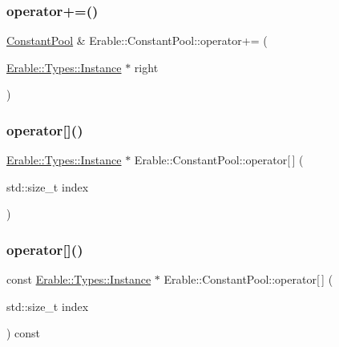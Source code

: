 \mbox{\label{class_erable_1_1_constant_pool_a910c3a76017076dcbb4930b3a9f30440}} 
\subsubsection{\texorpdfstring{operator+=()}{operator+=()}}
{\footnotesize\ttfamily \mbox{\hyperlink{class_erable_1_1_constant_pool}{Constant\+Pool}} \& Erable\+::\+Constant\+Pool\+::operator+= (\begin{DoxyParamCaption}\item[{\mbox{\hyperlink{class_erable_1_1_erable_1_1_types_1_1_instance}{Erable\+::\+Types\+::\+Instance}} $\ast$}]{right }\end{DoxyParamCaption})}

\mbox{\label{class_erable_1_1_constant_pool_a27b506e641c44a1775370d9c857f965d}} 
\subsubsection{\texorpdfstring{operator[]()}{operator[]()}\hspace{0.1cm}{\footnotesize\ttfamily [1/2]}}
{\footnotesize\ttfamily \mbox{\hyperlink{class_erable_1_1_erable_1_1_types_1_1_instance}{Erable\+::\+Types\+::\+Instance}} $\ast$ Erable\+::\+Constant\+Pool\+::operator\mbox{[}$\,$\mbox{]} (\begin{DoxyParamCaption}\item[{std\+::size\+\_\+t}]{index }\end{DoxyParamCaption})}

\mbox{\label{class_erable_1_1_constant_pool_af260e8d99d978ceeed2bfb15533e2e87}} 
\subsubsection{\texorpdfstring{operator[]()}{operator[]()}\hspace{0.1cm}{\footnotesize\ttfamily [2/2]}}
{\footnotesize\ttfamily const \mbox{\hyperlink{class_erable_1_1_erable_1_1_types_1_1_instance}{Erable\+::\+Types\+::\+Instance}} $\ast$ Erable\+::\+Constant\+Pool\+::operator\mbox{[}$\,$\mbox{]} (\begin{DoxyParamCaption}\item[{std\+::size\+\_\+t}]{index }\end{DoxyParamCaption}) const}

